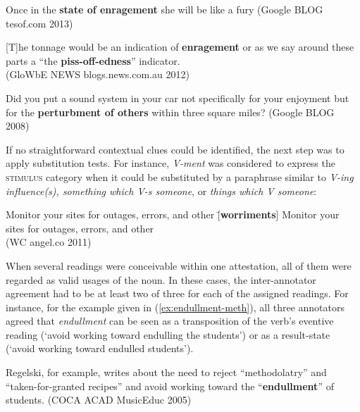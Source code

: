 \begin{exe}
	\ex
	\begin{xlist}
	\item \label{ex:enragement4-1} Once in the \textbf{state of enragement} she will be like a fury {\small (Google BLOG tesof.com 2013)}
	\item \label{ex:enragement4-2} [T]he tonnage would be an indication of \textbf{enragement} or as we say around these parts a ``the \textbf{piss-off-edness}'' indicator. \\{\small (\ac{GloWbE} NEWS blogs.news.com.au 2012)}
	\item \label{ex:perturbment} Did you put a sound system in your car not specifically for your enjoyment but for the \textbf{perturbment of others} within three square miles? {\small (Google BLOG 2008)}
	\end{xlist}
\end{exe}

\noindent If no straightforward contextual clues could be identified, the next step was to apply substitution tests. For instance, \textit{V-ment} was considered to express the \textsc{stimulus} category when it could be substituted by a paraphrase similar to \textit{V-ing influence(s), something which V-s someone}, or \textit{things which V someone}:

\begin{exe}
	\ex \label{ex:worriment} 
	\begin{tabbing} 
		Monitor your sites for outages, errors, and other \= [\textbf{worriments}]  \kill
		Monitor your sites for outages, errors, and other   \\
		{\small (\ac{WC} angel.co 2011)}    
	\end{tabbing}
\end{exe}

\noindent When several readings were conceivable within one attestation, all of them were regarded as valid usages of the noun. In these cases, the inter-annotator agreement had to be at least two of three for each of the assigned readings. For instance, for the example given in (\ref{ex:endullment-meth}), all three annotators agreed that \textit{endullment} can be seen as a transposition of the verb's eventive reading (`avoid working toward endulling the students') or as a result-state (`avoid working toward endulled students'). 

\begin{exe}
	\ex \label{ex:endullment-meth} Regelski, for example, writes about the need to reject ``methodolatry'' and ``taken-for-granted recipes'' and avoid working toward the ``\textbf{endullment}'' of students. {\small (\acs{COCA} ACAD MusicEduc 2005)}
\end{exe}

